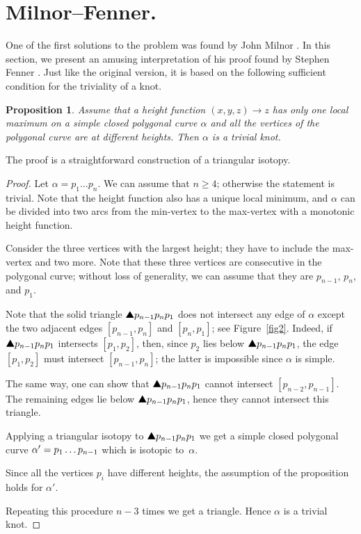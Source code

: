 \documentclass{article}
\newcommand*{\arXiv}[2]{#1} %
\newcommand*{\z}[1]{#1\nobreak\discretionary{}%
            {\hbox{$\mathsurround=0pt #1$}}{}}
\theoremstyle{theorem}
\newtheorem{Proposition}[theorem]{Proposition}
\newtheorem{Crofton-type formula}[theorem]{Crofton-type formula}
\newtheorem{Douglas--Rado theorem}[theorem]{\arXiv{Douglas--Rado theorem}{Theorem}}
\newtheorem{Extended monotonicity theorem}[theorem]{\arXiv{Extended monotonicity theorem}{Theorem}}
\theoremstyle{definition}
\def\solidtriangle{\text{\ding{115}}}
\def\ge{\geqslant}
\begin{document}
\section{Milnor--Fenner.}

One of the first solutions to the problem was found by John Milnor \cite{milnor}.
In this section, we present an amusing interpretation of his proof found by Stephen Fenner \cite{ferner}.
Just like the original version, it is based on the following sufficient condition for the triviality of a knot.

\begin{Proposition}\label{prop:one-max-one-min}
Assume that a height function $(x,y,z)\to z$ 
has only one local maximum on a simple closed polygonal curve $\alpha$ and all the vertices of the polygonal curve are at different heights.
Then $\alpha$ is a trivial knot.
\end{Proposition}

The proof is a straightforward construction of a triangular isotopy. 

\begin{proof}
Let $\alpha=p_1\dots p_n$.
We can assume that $n\ge 4$; otherwise the statement is trivial.
Note that the height function also has a unique local minimum, and $\alpha$ can be divided into two arcs from the min-vertex to the max-vertex with a monotonic height function.

Consider the three vertices with the largest height;
they have to include the max-vertex and two more.
Note that these three vertices are consecutive in the polygonal curve; 
without loss of generality, we can assume that they are $p_{n-1}$, $p_n$, and $p_1$.

Note that the solid triangle $\solidtriangle p_{n-1}p_np_1$ does not intersect any edge of $\alpha$ except the two adjacent edges $[p_{n-1},p_n]$ and $[p_n,p_1]$; see Figure~\ref{fig2}.
Indeed, if $\solidtriangle p_{n-1}p_np_1$ intersects $[p_1,p_2]$,
then, 
since $p_2$ lies below $\solidtriangle p_{n-1}p_np_1$,
the edge $[p_1,p_2]$ must intersect $[p_{n-1},p_n]$;
the latter is impossible since $\alpha$ is simple.

\arXiv{The}{In the} same way, one can show that $\solidtriangle p_{n-1}p_np_1$ cannot intersect $[p_{n-2},p_{n-1}]$.
The remaining edges lie below $\solidtriangle p_{n-1}p_np_1$, hence they cannot intersect this triangle.

Applying a triangular isotopy to $\solidtriangle p_{n-1}p_np_1$ we get a simple closed polygonal curve $\alpha'\z=p_1\dots p_{n-1}$ which is isotopic to~$\alpha$.

Since all the vertices $p_i$ have different heights,
the assumption of the proposition holds for $\alpha'$.

Repeating this procedure $n-3$ times we get a triangle.
Hence $\alpha$ is a trivial knot.
\end{proof}
\end{document}
